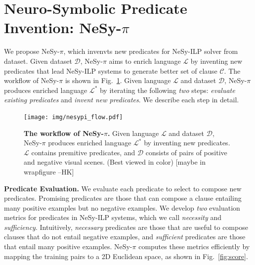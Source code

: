 \documentclass[
]{ceurart}
\newcommand{\hk}[1]{\textcolor{Apricot}{[#1 \textsc{--HK}]}}
\begin{document}
	\section{Neuro-Symbolic Predicate Invention: NeSy-$ \pi $}
	We propose NeSy-$\pi$, which invenvts new predicates for NeSy-ILP solver from dataset.
	Given dataset $\mathcal{D}$, NeSy-$\pi$ aims to enrich language $\mathcal{L}$ by inventing new predicates that lead NeSy-ILP systems to generate better set of clause $\mathcal{C}$. The workflow of NeSy-$\pi$ is shown in Fig.~\ref{fig:nesypi_flow}.
	Given language $\mathcal{L}$ and dataset $\mathcal{D}$, NeSy-$\pi$ produces enriched language $\mathcal{L}^*$ by  iterating the following \emph{two} steps:  \emph{evaluate existing predicates} and \emph{invent new predicates}. 
	We describe each step in detail.
	\begin{figure}
		\centering
		\texttt{[image: img/nesypi\_flow.pdf]}
		\caption{\textbf{The workflow of NeSy-$\pi$.} Given language $\mathcal{L}$ and dataset $\mathcal{D}$, NeSy-$\pi$ produces enriched language $\mathcal{L}^*$ by inventing new predicates. $\mathcal{L}$ contains premitive predicates, and $\mathcal{D}$ consists of pairs of positive and negative visual scenes. (Best viewed in color) \hk{maybe in wrapfigure} }
		\label{fig:nesypi_flow}
	\end{figure}
	
	\textbf{Predicate Evaluation.}
	We evaluate each predicate to select to compose new predicates. 
	Promising predicates are those that can compose a clause entailing many positive examples but no negative examples.
	We develop \emph{two} evaluation metrics for predicates in NeSy-ILP systems, which we call \emph{necessity} and \emph{sufficiency}. Intuitively, \emph{necessary} predicates are those that are useful to compose clauses that do not entail negative examples, and \emph{sufficient} predicates are those that entail many positive examples.
	NeSy-$\pi$ computes these metrics efficiently by mapping the training pairs to a 2D Euclidean space, as shown in Fig.~\ref{fig:score}.
	
\end{document}
